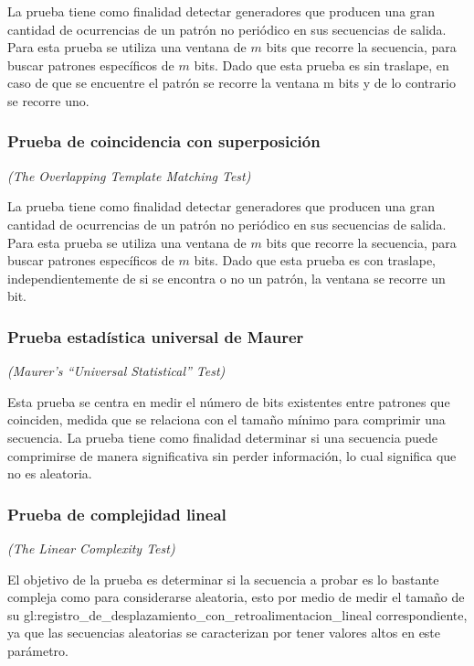 La prueba tiene como finalidad detectar generadores que producen una gran
cantidad de ocurrencias de un patrón no periódico en sus secuencias de salida.
Para esta prueba se utiliza una ventana de $m$ bits que recorre la secuencia,
para buscar patrones específicos de $m$ bits. Dado que esta prueba es sin
traslape, en caso de que se encuentre el patrón se recorre la ventana m bits
y de lo contrario se recorre uno.

\subsubsection{Prueba de coincidencia con superposición} %
\textit{(The Overlapping Template Matching Test)}

La prueba tiene como finalidad detectar generadores que producen una gran
cantidad de ocurrencias de un patrón no periódico en sus secuencias de salida.
Para esta prueba se utiliza una ventana de $m$ bits que recorre la secuencia,
para buscar patrones específicos de $m$ bits. Dado que esta prueba es con
traslape, independientemente de si se encontra o no un patrón, la ventana se
recorre un bit.

\subsubsection{Prueba estadística universal de Maurer} %
\textit{(Maurer’s “Universal Statistical” Test)}

Esta prueba se centra en medir el número de bits existentes entre patrones
que coinciden, medida que se relaciona con el tamaño mínimo para comprimir
una secuencia. La prueba tiene como finalidad determinar si una secuencia
puede comprimirse de manera significativa sin perder información, lo cual
significa que no es aleatoria.

\subsubsection{Prueba de complejidad lineal} %
\textit{(The Linear Complexity Test)}

El objetivo de la prueba es determinar si la secuencia a probar es lo bastante
compleja como para considerarse aleatoria, esto por medio de medir el tamaño de
su \gls{gl:registro_de_desplazamiento_con_retroalimentacion_lineal}
correspondiente, ya que las secuencias aleatorias se caracterizan por tener
valores altos en este parámetro.

